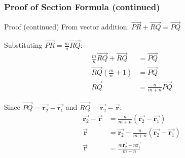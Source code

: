 \begin{frame}
    \frametitle{Proof of Section Formula (continued)}
    \begin{block}{Proof (continued)}
    From vector addition: \(\vec{PR} + \vec{RQ} = \vec{PQ}\)
    
    Substituting \(\vec{PR} = \frac{m}{n}\vec{RQ}\):
    \begin{align}
        \frac{m}{n}\vec{RQ} + \vec{RQ} &= \vec{PQ} \\
        \vec{RQ}\left(\frac{m}{n} + 1\right) &= \vec{PQ} \\
        \vec{RQ} &= \frac{n}{m+n}\vec{PQ}
    \end{align}
    
    Since \(\vec{PQ} = \vec{\mathbf{r}_2} - \vec{\mathbf{r}_1}\) and \(\vec{RQ} = \vec{\mathbf{r}_2} - \vec{\mathbf{r}}\):
    \begin{align}
        \vec{\mathbf{r}_2} - \vec{\mathbf{r}} &= \frac{n}{m+n}(\vec{\mathbf{r}_2} - \vec{\mathbf{r}_1}) \\
        \vec{\mathbf{r}} &= \vec{\mathbf{r}_2} - \frac{n}{m+n}(\vec{\mathbf{r}_2} - \vec{\mathbf{r}_1}) \\
        \vec{\mathbf{r}} &= \frac{m\vec{\mathbf{r}_2} + n\vec{\mathbf{r}_1}}{m+n}
    \end{align}
    \end{block}
\end{frame}



